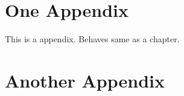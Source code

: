 \begin{appendices}
\chapter{One Appendix}
\label{app_one}

This is a appendix. Behaves same as a chapter.


\chapter{Another Appendix}
\label{plots_app}

\end{appendices}